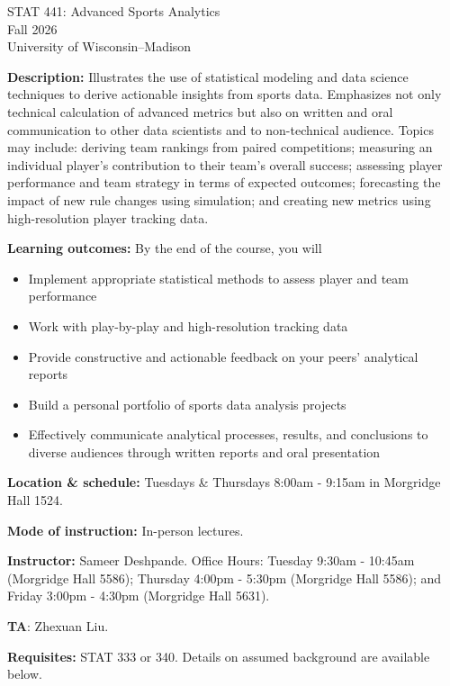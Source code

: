 \documentclass[11pt]{article}
\begin{document}
\begin{center}
\Large{STAT 441: Advanced Sports Analytics} \\
\large{Fall 2026} \\
University of Wisconsin--Madison
\end{center}

\singlespacing

\textbf{Description:} Illustrates the use of statistical modeling and data science techniques to derive actionable insights from sports data. Emphasizes not only technical calculation of advanced metrics but also on written and oral communication to other data scientists and to non-technical audience. Topics may include: deriving team rankings from paired competitions; measuring an individual player's contribution to their team's overall success; assessing player performance and team strategy in terms of expected outcomes; forecasting the impact of new rule changes using simulation; and creating new metrics using high-resolution player tracking data.

\textbf{Learning outcomes:} By the end of the course, you will
\begin{itemize}
\item{Implement appropriate statistical methods to assess player and team performance}
\item{Work with play-by-play and high-resolution tracking data}
\item{Provide constructive and actionable feedback on your peers' analytical reports}
\item{Build a personal portfolio of sports data analysis projects}
\item{Effectively communicate analytical processes, results, and conclusions to diverse audiences through written reports and oral presentation} 
\end{itemize}

\textbf{Location \& schedule:} Tuesdays \& Thursdays 8:00am - 9:15am in Morgridge Hall 1524.

\textbf{Mode of instruction:} In-person lectures.

\textbf{Instructor:} Sameer Deshpande. Office Hours: Tuesday 9:30am - 10:45am (Morgridge Hall 5586); Thursday 4:00pm - 5:30pm (Morgridge Hall 5586); and Friday 3:00pm - 4:30pm (Morgridge Hall 5631). 

\textbf{TA}: Zhexuan Liu. 

\textbf{Requisites:} STAT 333 or 340. Details on assumed background are available below.
\end{document}

